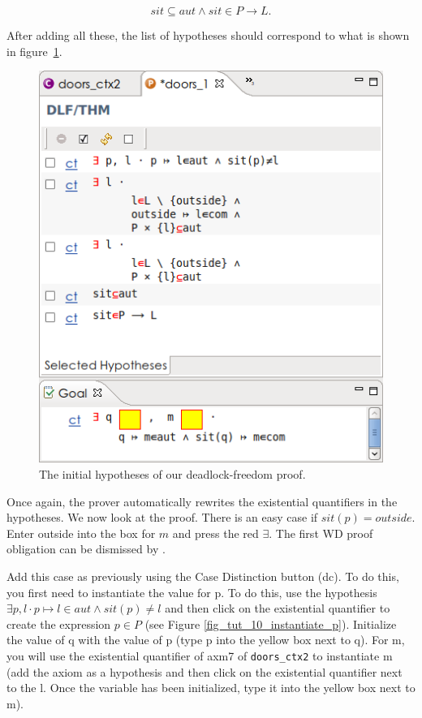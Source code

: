 \[
sit \subseteq aut \land sit \in P \mathbin \rightarrow L.
\]

After adding all these, the list of hypotheses should correspond to what is shown in figure~\ref{fig_tut_10_proofs}.

\begin{figure}[!ht]
\begin{center}
	\includegraphics[]{img/tutorial/tut_10_refinement1_proofs.png}
	\caption{The initial hypotheses of our deadlock-freedom proof.}
	\label{fig_tut_10_proofs}
\end{center}
\end{figure}

Once again, the prover automatically rewrites the existential quantifiers in the hypotheses. We now look at the proof. There is an easy case if $sit(p) = outside$. Enter \textsf{outside} into the box for $m$ and press the red $\exists$.  The first WD proof obligation can be dismissed by .




Add this case as previously using the \textsf{Case Distinction button (dc)}. To do this, you first need to instantiate the value for p. To do this, use the hypothesis $\exists p, l \cdot p \mapsto l \in aut \land sit(p) \neq l$ and then click on the existential quantifier to create the expression $ p \in P $ (see Figure \ref{fig_tut_10_instantiate_p}). Initialize the value of \textsf{q} with the value of \textsf{p} (type p into the yellow box next to q). For \textsf{m}, you will use the existential quantifier of \textsf{axm7} of \texttt{doors\_ctx2} to instantiate \textsf{m} (add the axiom as a hypothesis and then click on the existential quantifier next to the l. Once the variable has been initialized, type it into the yellow box next to m).

